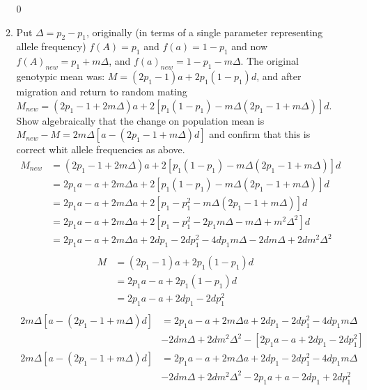 \documentclass[12pt,a4paper]{paper}
\begin{document}
\begin{enumerate}
\begin{enumerate}
\begin{Schunk}
\begin{Soutput}
[1] 0
\end{Soutput}
\end{Schunk}
\item Put $\Delta = p_{2} - p_{1}$, originally (in terms of a single parameter representing allele frequency) $f(A) = p_{1}$ and $f(a) = 1 - p_{1}$ and now $f(A)_{new} = p_{1} + m\Delta$, and $f(a)_{new} = 1 - p_{1} - m\Delta$. The original genotypic mean was: $M = (2p_{1}-1)a + 2p_{1}(1-p_{1})d$, and after migration and return to random mating $M_{new}=(2p_{1} -1 + 2m\Delta)a + 2[p_{1}(1-p_{1})-m\Delta(2p_{1} - 1 + m\Delta)]d$. Show algebraically that the change on population mean is $M_{new} - M = 2m\Delta[a-(2p_{1}-1+m\Delta)d]$ and confirm that this is correct whit allele frequencies as above.
\begin{equation}
\begin{split}
M_{new} & = (2p_{1} -1 + 2m\Delta)a + 2[p_{1}(1-p_{1})-m\Delta(2p_{1} - 1 + m\Delta)]d \\
& = 2p_{1}a - a + 2m\Delta a + 2[p_{1}(1-p_{1})-m\Delta(2p_{1} - 1 + m\Delta)]d\\
& = 2p_{1}a - a + 2m\Delta a + 2[p_{1} - p_{1}^{2} - m\Delta(2p_{1} - 1 + m\Delta)]d \\
& = 2p_{1}a - a + 2m\Delta a + 2[p_{1} - p_{1}^{2} - 2p_{1}m\Delta - m\Delta + m^{2}\Delta^{2}]d\\
& = 2p_{1}a - a + 2m\Delta a + 2dp_{1} - 2dp_{1}^{2} - 4dp_{1}m\Delta - 2dm\Delta + 2dm^{2}\Delta^{2}\\
\end{split}
\end{equation}
\begin{equation}
\begin{split}
M & = (2p_{1}-1)a + 2p_{1}(1-p_{1})d \\
& = 2p_{1}a - a + 2p_{1}(1-p_{1})d \\
& = 2p_{1}a - a + 2dp_{1}- 2dp_{1}^{2} \\
\end{split}
\end{equation}
\begin{equation}
\begin{split}
2m\Delta[a-(2p_{1}-1+m\Delta)d] & = 2p_{1}a - a + 2m\Delta a + 2dp_{1} - 2dp_{1}^{2} - 4dp_{1}m\Delta\\& - 2dm\Delta + 2dm^{2}\Delta^{2} - [2p_{1}a - a + 2dp_{1}- 2dp_{1}^{2}] \\
2m\Delta[a-(2p_{1}-1+m\Delta)d] & = 2p_{1}a - a + 2m\Delta a + 2dp_{1} - 2dp_{1}^{2} - 4dp_{1}m\Delta\\& - 2dm\Delta + 2dm^{2}\Delta^{2} - 2p_{1}a + a - 2dp_{1}+ 2dp_{1}^{2} \\

\end{split}
\end{equation}
\end{enumerate}
\end{enumerate}
\end{document}
